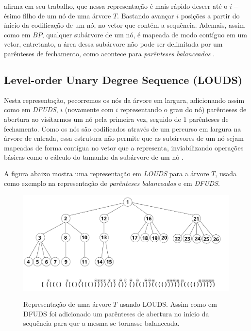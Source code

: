 \citet{book-compact-data-structures} afirma em seu trabalho, que nessa representação é mais  rápido descer até o $i-$ésimo filho de um nó de uma árvore $T$. Bastando avançar  $i$ posições a partir do ínicio da codificação de um nó, no vetor que contém a sequência. Ademais, assim como em $BP$, qualquer subárvore de um nó, é mapeada de modo contíguo em um vetor, entretanto, a área dessa subárvore não pode ser delimitada por um parênteses de fechamento, como acontece para \textit{parênteses balanceados} \citep{book-compact-data-structures}.

\subsection{Level-order Unary Degree Sequence (LOUDS)}
Nesta representação, pecorremos os nós da árvore em largura, adicionando assim como em \textit{DFUDS}, $i$ (novamente com $i$ representando o grau do nó) parênteses de abertura ao visitarmos um nó pela primeira vez, seguido de $1$ parênteses de fechamento.
 Como os nós são codificados através de um percurso em largura na árvore de entrada, essa estrutura não permite que as subárvores de um nó sejam mapeadas de forma contígua no vetor que a representa, inviabilizando operações básicas como o cálculo do tamanho da subárvore de um nó \citep{book-compact-data-structures,paper-fully-functinal-succint-trees}.

A figura abaixo mostra uma representação em \textit{LOUDS} para a árvore $T$, usada como exemplo na representação de \textit{parênteses balanceados} e em \textit{DFUDS}.

\begin{figure}[!ht]
    \centering
      \caption[Representação de árvores com Level-order Unary Degree Sequence]{Representação de uma árvore $T$ usando LOUDS. 
      Assim como em DFUDS foi adicionado um parênteses de abertura no início da sequência  para que a mesma se tornasse balanceada.}
      \includegraphics[width=\columnwidth]{images/dfuds.png}
      \label{fig:dfudus-representation}
\end{figure}

